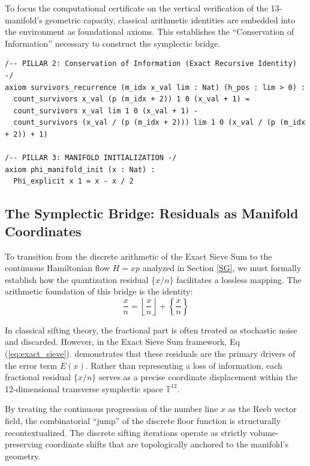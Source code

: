 \documentclass[sn-mathphys-num, pdflatex, referee]{sn-jnl}
\begin{document}
To focus the computational certificate on the vertical verification of the 13-manifold's geometric capacity, classical arithmetic identities are embedded into the environment as foundational axioms. This establishes the ``Conservation of Information'' necessary to construct the symplectic bridge.

\begin{verbatim}
/-- PILLAR 2: Conservation of Information (Exact Recursive Identity) -/
axiom survivors_recurrence (m_idx x_val lim : Nat) (h_pos : lim > 0) :
  count_survivors x_val (p (m_idx + 2)) 1 0 (x_val + 1) =
  count_survivors x_val lim 1 0 (x_val + 1) -
  count_survivors (x_val / (p (m_idx + 2))) lim 1 0 (x_val / (p (m_idx + 2)) + 1)

/-- PILLAR 3: MANIFOLD INITIALIZATION -/
axiom phi_manifold_init (x : Nat) :
  Phi_explicit x 1 = x - x / 2
\end{verbatim}

\subsection{The Symplectic Bridge: Residuals as Manifold Coordinates}

To transition from the discrete arithmetic of the Exact Sieve Sum to the continuous Hamiltonian flow $H=xp$ analyzed in Section \ref{SG}, we must formally establish how the quantization residual $\{x/n\}$ facilitates a lossless mapping. The arithmetic foundation of this bridge is the identity:
\begin{equation}
\frac{x}{n} = \left\lfloor \frac{x}{n} \right\rfloor + \left\{\frac{x}{n}\right\}
\end{equation}

In classical sifting theory, the fractional part is often treated as stochastic noise and discarded. However, in the Exact Sieve Sum framework, Eq (\ref{eq:exact_sieve}). demonstrates that these residuals are the primary drivers of the error term $E(x)$. Rather than representing a loss of information, each fractional residual $\{x/n\}$ serves as a precise coordinate displacement within the 12-dimensional transverse symplectic space $\mathbb{T}^{12}$.

By treating the continuous progression of the number line $x$ as the Reeb vector field, the combinatorial ``jump'' of the discrete floor function is structurally recontextualized. The discrete sifting iterations operate as strictly volume-preserving coordinate shifts that are topologically anchored to the manifold's geometry. 
\end{document}
